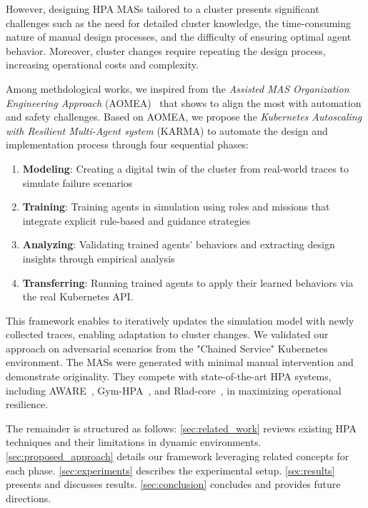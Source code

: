 However, designing HPA MASs tailored to a cluster presents significant challenges such as the need for detailed cluster knowledge, the time-consuming nature of manual design processes, and the difficulty of ensuring optimal agent behavior. Moreover, cluster changes require repeating the design process, increasing operational costs and complexity.

Among methdological works, we inspired from the \textit{Assisted MAS Organization Engineering Approach} (AOMEA)~\cite{soule2024aomea} that shows to align the most with automation and safety challenges. Based on AOMEA, we propose the \textit{Kubernetes Autoscaling with Resilient Multi-Agent system} (KARMA) to automate the design and implementation process through four sequential phases:
\begin{enumerate}[label=\textbf{\arabic*)}, itemjoin={;\quad }]
    \item \textbf{Modeling}: Creating a digital twin of the cluster from real-world traces to simulate failure scenarios
    \item \textbf{Training}: Training agents in simulation using roles and missions that integrate explicit rule-based and guidance strategies
    \item \textbf{Analyzing}: Validating trained agents' behaviors and extracting design insights through empirical analysis
    \item \textbf{Transferring}: Running trained agents to apply their learned behaviors via the real Kubernetes API.
\end{enumerate}

This framework enables to iteratively updates the simulation model with newly collected traces, enabling adaptation to cluster changes. We validated our approach on adversarial scenarios from the "Chained Service" Kubernetes environment. The MASs were generated with minimal manual intervention and demonstrate originality. They compete with state-of-the-art HPA systems, including AWARE~\cite{aware2023}, Gym-HPA~\cite{gymhpa2022}, and Rlad-core~\cite{Rossi2019}, in maximizing operational resilience.

The remainder is structured as follows:
\autoref{sec:related_work} reviews existing HPA techniques and their limitations in dynamic environments.
\autoref{sec:proposed_approach} details our framework leveraging related concepts for each phase.
\autoref{sec:experiments} describes the experimental setup.
\autoref{sec:results} presents and discusses results.
\autoref{sec:conclusion} concludes and provides future directions.

